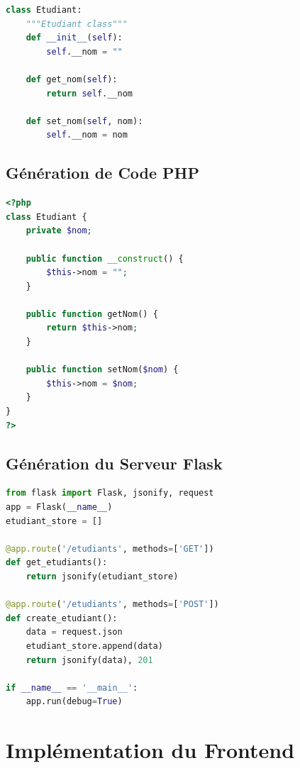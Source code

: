 \begin{lstlisting}[language=Python, caption=Exemple de code Python généré]
class Etudiant:
    """Etudiant class"""
    def __init__(self):
        self.__nom = ""

    def get_nom(self):
        return self.__nom

    def set_nom(self, nom):
        self.__nom = nom
\end{lstlisting}

\subsection{Génération de Code PHP}

\begin{lstlisting}[language=PHP, caption=Exemple de code PHP généré]
<?php
class Etudiant {
    private $nom;

    public function __construct() {
        $this->nom = "";
    }

    public function getNom() {
        return $this->nom;
    }

    public function setNom($nom) {
        $this->nom = $nom;
    }
}
?>
\end{lstlisting}

\subsection{Génération du Serveur Flask}

\begin{lstlisting}[language=Python, caption=Exemple de serveur Flask généré]
from flask import Flask, jsonify, request
app = Flask(__name__)
etudiant_store = []

@app.route('/etudiants', methods=['GET'])
def get_etudiants():
    return jsonify(etudiant_store)

@app.route('/etudiants', methods=['POST'])
def create_etudiant():
    data = request.json
    etudiant_store.append(data)
    return jsonify(data), 201

if __name__ == '__main__':
    app.run(debug=True)
\end{lstlisting}

\section{Implémentation du Frontend}

